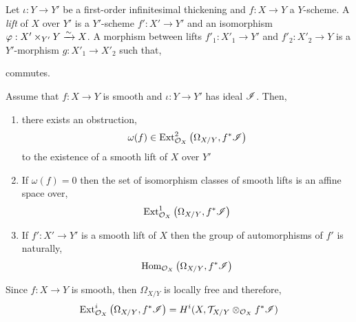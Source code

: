 \documentclass[12pt]{article}
\begin{document}
\begin{defn}
Let $\iota : Y \to Y'$ be a first-order infinitesimal thickening and $f : X \to Y$ a $Y$-scheme. A \textit{lift} of $X$ over $Y'$ is a $Y'$-scheme $f' : X' \to Y'$ and an isomorphism $\varphi : X' \times_{Y'} Y \xrightarrow{\sim} X$. A morphism between lifts $f'_1 : X'_1 \to Y'$ and $f'_2 : X'_2 \to Y$ is a $Y'$-morphism $g : X'_1 \to X'_2$ such that,
\begin{center}
\end{center}
commutes.
\end{defn}

\begin{prop}
Assume that $f : X \to Y$ is smooth and $\iota : Y \to Y'$ has ideal $\mathscr{I}$. Then,
\begin{enumerate}
\item there exists an obstruction,
\[ \omega(f) \in \mathrm{Ext}^{2}_{\mathcal{O}_{X}} \left( \Omega_{X/Y}, f^*\mathscr{I} \right) \]
to the existence of a smooth lift of $X$ over $Y'$
\item If $\omega(f) = 0$ then the set of isomorphism classes of smooth lifts is an affine space over,
\[ \mathrm{Ext}^{1}_{\mathcal{O}_{X}} \left( \Omega_{X/Y}, f^* \mathscr{I} \right) \]
\item If $f' : X' \to Y'$ is a smooth lift of $X$ then the group of automorphisms of $f'$ is naturally, 
\[ \mathrm{Hom}_{\mathcal{O}_{X}} \left( \Omega_{X/Y}, f^* \mathscr{I} \right) \]
\end{enumerate}
\end{prop}

\newcommand{\Zar}{\mathrm{Zar}}

\begin{rmk}
Since $f : X \to Y$ is smooth, then $\Omega_{X/Y}$ is locally free and therefore,
\[ \mathrm{Ext}^{i}_{\mathcal{O}_{X}} \left( \Omega_{X/Y}, f^* \mathscr{I} \right) = H^i(X, \mathcal{T}_{X/Y} \otimes_{\mathcal{O}_{X}} f^* \mathscr{I}) \]
\end{rmk}
\end{document}
